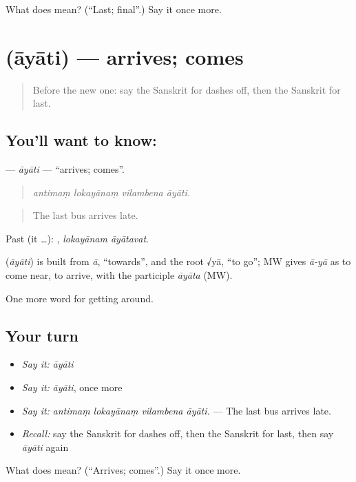 \begin{tcolorbox}[breakable,colback=teal!4,colframe=teal!35!black,title={Before you move on}]
What does  mean? (\textquotedblleft{}Last; final\textquotedblright{}.) Say it once more.
\end{tcolorbox}
\section[\texorpdfstring{\sk{आयाति} (āyāti)}{आयाति (āyāti)}]{ (āyāti) — arrives; comes}

\label{lesson:SA-C405-ayati}



\begin{quote}
Before the new one: say the Sanskrit for dashes off, then the Sanskrit for last.
\end{quote}

\subsection*{You'll want to know: }
\textbf{} — \emph{āyāti} — \textquotedblleft{}arrives; comes\textquotedblright{}.

\begin{quote}
   
\end{quote}

\begin{quote}
\emph{antimaṃ lokayānaṃ vilambena āyāti.}
\end{quote}

\begin{quote}
The last bus arrives late.
\end{quote}

Past (it …):  , \emph{lokayānam āyātavat}.

\begin{cousinweb}
\textbf{} (\emph{āyāti}) is built from \emph{ā}, \textquotedblleft{}towards\textquotedblright{}, and the root √yā, \textquotedblleft{}to go\textquotedblright{}; MW gives \emph{ā-yā} as to come near, to arrive, with the participle \emph{āyāta} (MW).
\end{cousinweb}

\begin{grammarlens}[title={What you've built}]
One more word for getting around.
\end{grammarlens}

\subsection*{Your turn}
\begin{itemize}
\raggedright
  \item \emph{Say it:} \emph{āyāti}
  \item \emph{Say it:} \emph{āyāti}, once more
  \item \emph{Say it:} \emph{antimaṃ lokayānaṃ vilambena āyāti.} — The last bus arrives late.
  \item \emph{Recall:} say the Sanskrit for dashes off, then the Sanskrit for last, then say \emph{āyāti} again
\end{itemize}

\begin{tcolorbox}[breakable,colback=teal!4,colframe=teal!35!black,title={Before you move on}]
What does  mean? (\textquotedblleft{}Arrives; comes\textquotedblright{}.) Say it once more.
\end{tcolorbox}
